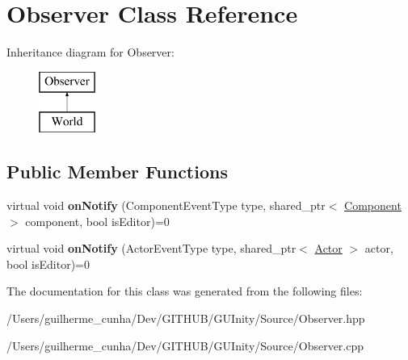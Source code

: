 \hypertarget{class_observer}{}\section{Observer Class Reference}
\label{class_observer}
Inheritance diagram for Observer\+:\begin{figure}[H]
\begin{center}
\leavevmode
\includegraphics[height=2.000000cm]{class_observer}
\end{center}
\end{figure}
\subsection*{Public Member Functions}
\begin{DoxyCompactItemize}
\item 
\hypertarget{class_observer_ab9deb73c274eec9442cf94b63b1bee57}{}virtual void {\bfseries on\+Notify} (Component\+Event\+Type type, shared\+\_\+ptr$<$ \hyperlink{class_component}{Component} $>$ component, bool is\+Editor)=0\label{class_observer_ab9deb73c274eec9442cf94b63b1bee57}

\item 
\hypertarget{class_observer_a982c319d757f7b82cfd47f3da2db9c76}{}virtual void {\bfseries on\+Notify} (Actor\+Event\+Type type, shared\+\_\+ptr$<$ \hyperlink{class_actor}{Actor} $>$ actor, bool is\+Editor)=0\label{class_observer_a982c319d757f7b82cfd47f3da2db9c76}

\end{DoxyCompactItemize}


The documentation for this class was generated from the following files\+:\begin{DoxyCompactItemize}
\item 
/\+Users/guilherme\+\_\+cunha/\+Dev/\+G\+I\+T\+H\+U\+B/\+G\+U\+Inity/\+Source/Observer.\+hpp\item 
/\+Users/guilherme\+\_\+cunha/\+Dev/\+G\+I\+T\+H\+U\+B/\+G\+U\+Inity/\+Source/Observer.\+cpp\end{DoxyCompactItemize}
